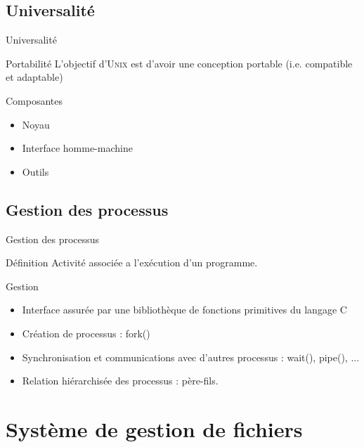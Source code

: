 \subsection{Universalité}
\begin{frame}{Universalité}
\begin{alertblock}{Portabilité}
L'objectif d'\textsc{Unix} est d'avoir une conception portable (i.e. compatible et adaptable)
\end{alertblock}

\begin{block}{Composantes}
\begin{itemize}
\item Noyau
\item Interface homme-machine
\item Outils
\end{itemize}
\end{block}
\end{frame}

\subsection{Gestion des processus}
\begin{frame}{Gestion des processus}
\begin{alertblock}{Définition}
Activité associée a l'exécution d'un programme.
\end{alertblock}

\begin{block}{Gestion}

\begin{itemize}
\item Interface assurée par une bibliothèque de fonctions primitives du langage C
\item Création de processus : fork()
\item Synchronisation et communications avec d'autres processus : wait(), pipe(), ...
\item Relation hiérarchisée des processus : père-fils.
\end{itemize}
\end{block}
\end{frame}



\section{Système de gestion de fichiers}
